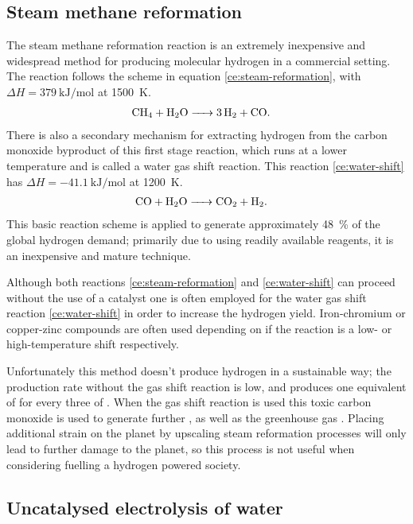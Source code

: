 \subsection{Steam methane reformation}%
\label{sub:steam_methane_reformation}

The steam methane reformation reaction is an extremely inexpensive and widespread method for producing molecular hydrogen in a commercial setting.
The reaction follows the scheme\cite{Saxena2011} in equation \eqref{ce:steam-reformation}, with $\Delta H = \SI{379}{\kilo\joule\per\mole}$ at \SI{1500}{\kelvin}.
\begin{align}
	\ce{CH4 + H2O &-> 3H2 + CO} \label{ce:steam-reformation}
.\end{align}
There is also a secondary mechanism for extracting hydrogen from the carbon monoxide byproduct of this first stage reaction, which runs at a lower temperature and is called a water gas shift reaction\cite{Chen2008,Saxena2011}.
This reaction \eqref{ce:water-shift} has $\Delta H = \SI{-41.1}{\kilo\joule\per\mole}$ at \SI{1200}{\kelvin}.
\begin{align}
	\ce{CO + H2O &-> CO2 + H2}\label{ce:water-shift} 
.\end{align}
This basic reaction scheme is applied to generate approximately \SI{48}{\percent} of the global hydrogen demand\cite{SBN2020}; primarily due to using readily available reagents, it is an inexpensive and mature technique.

Although both reactions \eqref{ce:steam-reformation} and \eqref{ce:water-shift} can proceed without the use of a catalyst one is often employed for the water gas shift reaction \eqref{ce:water-shift} in order to increase the hydrogen yield.
Iron-chromium or copper-zinc compounds are often used depending on if the reaction is a low- or high-temperature shift respectively.

Unfortunately this method doesn't produce hydrogen in a sustainable way; the production rate without the gas shift reaction is low, and produces one equivalent of  for every three of .
When the gas shift reaction is used this toxic carbon monoxide is used to generate further , as well as the greenhouse gas .
Placing additional strain on the planet by upscaling steam reformation processes will only lead to further damage to the planet, so this process is not useful when considering fuelling a hydrogen powered society.


\subsection{Uncatalysed electrolysis of water}%
\label{sub:uncatalysed_electrolysis_of_water}

